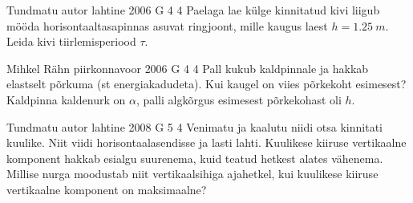 \documentclass[11pt]{article}
\begin{document}
{%
{Tundmatu autor} %
{lahtine} %
{2006} %
{G 4} %
{4} %
{
\ifStatement
Paelaga lae külge kinnitatud kivi liigub mööda horisontaaltasapinnas asuvat ringjoont, mille kaugus laest $h = \SI{1,25}{m}$. Leida kivi tiirlemisperiood $\tau$. 
\fi
}

{Mihkel Rähn} %
{piirkonnavoor} %
{2006} %
{G 4} %
{4} %
{
\ifStatement
Pall kukub kaldpinnale ja hakkab elastselt põrkuma (st energiakadudeta). Kui kaugel on viies põrkekoht esimesest? Kaldpinna kaldenurk on $\alpha$, palli algkõrgus esimesest põrkekohast oli $h$.
\fi
}

{Tundmatu autor} %
{lahtine} %
{2008} %
{G 5} %
{4} %
{
\ifStatement
Venimatu ja kaalutu niidi otsa kinnitati kuulike.
Niit viidi horisontaalasendisse ja lasti lahti. Kuulikese kiiruse vertikaalne komponent
hakkab esialgu suurenema, kuid teatud hetkest alates vähenema. Millise nurga moodustab niit vertikaalsihiga ajahetkel, kui kuulikese kiiruse vertikaalne komponent on
maksimaalne?
\fi
}

}
\end{document}
